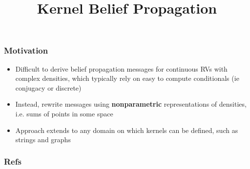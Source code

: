 \documentclass{beamer}
\title{Kernel Belief Propagation}
\begin{document}
 
\frame{\titlepage}
 
\begin{frame}
\frametitle{Motivation}
\begin{itemize}
\item Difficult to derive belief propagation messages for continuous RVs
    with complex densities, which typically rely on easy to compute conditionals
    (ie conjugacy or discrete)
\item Instead, rewrite messages using \textbf{nonparametric} representations
of densities, i.e. sums of points in some space
\item Approach extends to any domain on which kernels can be defined,
such as strings and graphs
\end{itemize}
\end{frame}

\begin{frame}
\frametitle{}
\end{frame}

\begin{frame}
\frametitle{Refs}

\end{frame}
\end{document}
